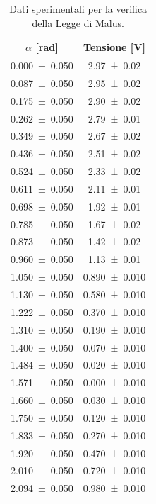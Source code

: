 \documentclass[a4paper]{article}
\begin{document}
\begin{table}[htbp]
\centering
\caption{Dati sperimentali per la verifica della Legge di Malus.}
\label{tab:dati_Malus}
\begin{tabular}{|c|c|}
\hline
$\alpha$ [\si{\radian}] & Tensione [\si{\volt}] \\\hline\hline
\SI{0.000 \pm 0.050}{} & \SI{2.97 \pm 0.02}{} \\
\SI{0.087 \pm 0.050}{} & \SI{2.95 \pm 0.02}{} \\
\SI{0.175 \pm 0.050}{} & \SI{2.90 \pm 0.02}{} \\
\SI{0.262 \pm 0.050}{} & \SI{2.79 \pm 0.01}{} \\
\SI{0.349 \pm 0.050}{} & \SI{2.67 \pm 0.02}{} \\
\SI{0.436 \pm 0.050}{} & \SI{2.51 \pm 0.02}{} \\
\SI{0.524 \pm 0.050}{} & \SI{2.33 \pm 0.02}{} \\
\SI{0.611 \pm 0.050}{} & \SI{2.11 \pm 0.01}{} \\
\SI{0.698 \pm 0.050}{} & \SI{1.92 \pm 0.01}{} \\
\SI{0.785 \pm 0.050}{} & \SI{1.67 \pm 0.02}{} \\
\SI{0.873 \pm 0.050}{} & \SI{1.42 \pm 0.02}{} \\
\SI{0.960 \pm 0.050}{} & \SI{1.13 \pm 0.01}{} \\
\SI{1.050 \pm 0.050}{} & \SI{0.890 \pm 0.010}{} \\ %
\SI{1.130 \pm 0.050}{} & \SI{0.580 \pm 0.010}{} \\ %
\SI{1.222 \pm 0.050}{} & \SI{0.370 \pm 0.010}{} \\ %
\SI{1.310 \pm 0.050}{} & \SI{0.190 \pm 0.010}{} \\ %
\SI{1.400 \pm 0.050}{} & \SI{0.070 \pm 0.010}{} \\ %
\SI{1.484 \pm 0.050}{} & \SI{0.020 \pm 0.010}{} \\ %
\SI{1.571 \pm 0.050}{} & \SI{0.000 \pm 0.010}{} \\ %
\SI{1.660 \pm 0.050}{} & \SI{0.030 \pm 0.010}{} \\ %
\SI{1.750 \pm 0.050}{} & \SI{0.120 \pm 0.010}{} \\ %
\SI{1.833 \pm 0.050}{} & \SI{0.270 \pm 0.010}{} \\ %
\SI{1.920 \pm 0.050}{} & \SI{0.470 \pm 0.010}{} \\ %
\SI{2.010 \pm 0.050}{} & \SI{0.720 \pm 0.010}{} \\ %
\SI{2.094 \pm 0.050}{} & \SI{0.980 \pm 0.010}{} \\ %

\end{tabular}
\end{table}
\end{document}
